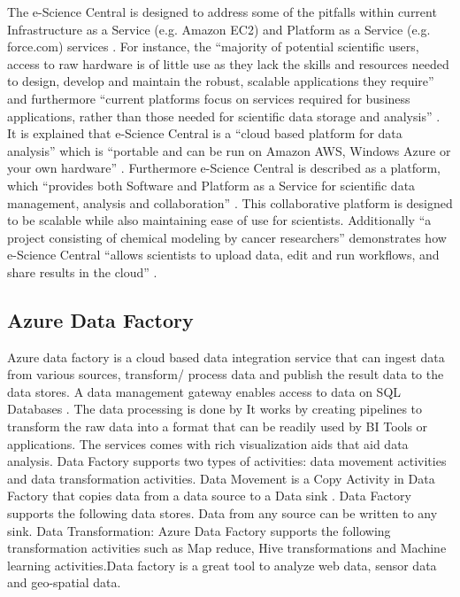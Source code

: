     The e-Science Central is designed to address some of the pitfalls
    within current Infrastructure as a Service (e.g.  Amazon EC2) and
    Platform as a Service (e.g. force.com) services
    \cite{e-science-central-paper-2010}. For instance, the ``majority of
    potential scientific users, access to raw hardware is
    of little use as they lack the skills and resources needed
    to design, develop and maintain the robust, scalable applications
    they require'' and furthermore ``current platforms focus on
    services required for business applications, rather than those
    needed for scientific
    data storage and analysis'' \cite{e-science-central-paper-2010}. It
    is explained that e-Science Central is a ``cloud based platform for
    data analysis'' which is ``portable and can be run on Amazon AWS,
    Windows Azure or your own hardware'' \cite{www-e-science-central}.
    Furthermore e-Science Central is described as a platform, which
    ``provides both Software and Platform as a Service for scientific
    data management, analysis and collaboration''
    \cite{e-science-central-paper-2010}. This collaborative platform is
    designed to be scalable while also maintaining ease of use for scientists.
    Additionally ``a project consisting of chemical modeling by cancer
    researchers'' demonstrates how e-Science Central ``allows scientists
    to upload data, edit and run workflows, and share results
    in the cloud'' \cite{e-science-central-paper-2010}.

    \pv

\subsection{Azure Data Factory \vc}
    
    Azure data factory is a cloud based data integration service that
    can ingest data from various sources, transform/ process data and
    publish the result data to the data stores. A data management
    gateway enables access to data on SQL Databases
    \cite{www-jamesserra}. The data processing is done by It works by
    creating pipelines to transform the raw data into a format that
    can be readily used by BI Tools or applications. The services
    comes with rich visualization aids that aid data analysis. Data
    Factory supports two types of activities: data movement activities
    and data transformation activities. Data Movement  is a Copy Activity
    in Data Factory that copies data from a data source
    to a Data sink \cite{www-microsoft-azure}. Data Factory
    supports the following data stores. Data from any source can be
    written to any sink.  Data Transformation: Azure Data Factory
    supports the following transformation activities such as Map
    reduce, Hive transformations and Machine learning activities.Data
    factory is a great tool to analyze web data, sensor data and
    geo-spatial data.

